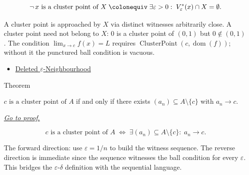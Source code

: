 \begin{remark*}
\[
  \neg\,x\text{ is a cluster point of }X
  \;\colonequiv\;
  \exists\varepsilon > 0 :\;
  V_\varepsilon^*(x) \cap X = \emptyset.
\]
\end{remark*}

\begin{remark*}[Interpretation]
A cluster point is approached by $X$ via distinct witnesses
arbitrarily close. A cluster point need not belong to $X$: $0$ is
a cluster point of $(0,1)$ but $0 \notin (0,1)$. The condition
$\lim_{x\to c}f(x)=L$ requires
$\operatorname{ClusterPoint}(c, \operatorname{dom}(f))$; without
it the punctured ball condition is vacuous.
\end{remark*}

\begin{dependencies}
\begin{itemize}
  \item \hyperref[def:deleted-epsilon-neighbourhood]{Deleted $\varepsilon$-Neighbourhood}
\end{itemize}
\end{dependencies}


\begin{theorembox}{Theorem}
\begin{theorem}
\label{thm:cluster-point-sequential}
$c\text{ is a cluster point of }A$ if and only if there exists
$(a_n) \subseteq A \setminus \{c\}$ with $a_n \to c$.

\smallskip\noindent
\hyperref[prf:cluster-point-sequential]{\textit{Go to proof.}}
\end{theorem}
\end{theorembox}

\begin{remark*}
\[
  c\text{ is a cluster point of }A
  \;\iff\;
  \exists (a_n) \subseteq A \setminus \{c\} :\;
  a_n\to c.
\]
\end{remark*}

\begin{remark*}[Interpretation]
The forward direction: use $\varepsilon = 1/n$ to build the witness
sequence. The reverse direction is immediate since the sequence
witnesses the ball condition for every $\varepsilon$. This bridges
the $\varepsilon$-$\delta$ definition with the sequential language.
\end{remark*}

